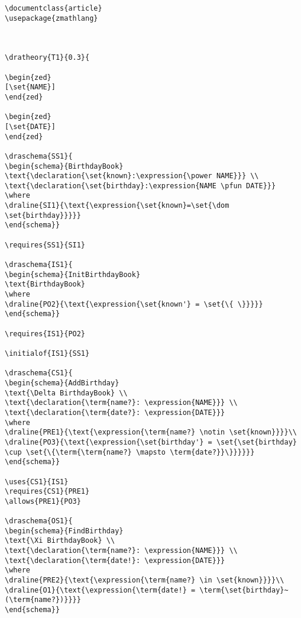 \begin{verbatim}
\documentclass{article}
\usepackage{zmathlang}



\dratheory{T1}{0.3}{

\begin{zed}
[\set{NAME}] 
\end{zed}

\begin{zed}
[\set{DATE}]
\end{zed}

\draschema{SS1}{
\begin{schema}{BirthdayBook}
\text{\declaration{\set{known}:\expression{\power NAME}}} \\
\text{\declaration{\set{birthday}:\expression{NAME \pfun DATE}}}
\where
\draline{SI1}{\text{\expression{\set{known}=\set{\dom \set{birthday}}}}}
\end{schema}}

\requires{SS1}{SI1}

\draschema{IS1}{
\begin{schema}{InitBirthdayBook}
\text{BirthdayBook}
\where
\draline{PO2}{\text{\expression{\set{known'} = \set{\{ \}}}}}
\end{schema}}

\requires{IS1}{PO2}

\initialof{IS1}{SS1}

\draschema{CS1}{
\begin{schema}{AddBirthday}
\text{\Delta BirthdayBook} \\
\text{\declaration{\term{name?}: \expression{NAME}}} \\
\text{\declaration{\term{date?}: \expression{DATE}}}
\where
\draline{PRE1}{\text{\expression{\term{name?} \notin \set{known}}}}\\
\draline{PO3}{\text{\expression{\set{birthday'} = \set{\set{birthday} \cup \set{\{\term{\term{name?} \mapsto \term{date?}}\}}}}}}
\end{schema}}

\uses{CS1}{IS1}
\requires{CS1}{PRE1}
\allows{PRE1}{PO3}

\draschema{OS1}{
\begin{schema}{FindBirthday}
\text{\Xi BirthdayBook} \\
\text{\declaration{\term{name?}: \expression{NAME}}} \\
\text{\declaration{\term{date!}: \expression{DATE}}}
\where
\draline{PRE2}{\text{\expression{\term{name?} \in \set{known}}}}\\
\draline{O1}{\text{\expression{\term{date!} = \term{\set{birthday}~(\term{name?})}}}}
\end{schema}}


\end{verbatim}
